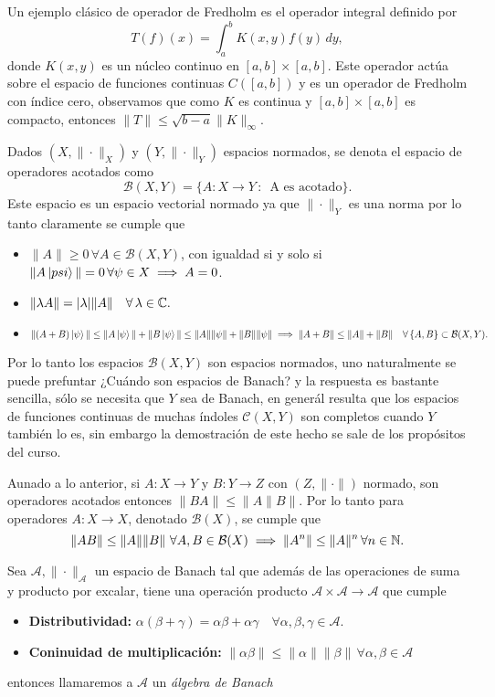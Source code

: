 \documentclass[main.tex]{subfiles}
\begin{document}
\eje Un ejemplo clásico de operador de Fredholm es el operador integral definido por
\[
T(f)(x) = \int_a^b K(x, y) f(y) \, dy,
\]
donde \(K(x, y)\) es un núcleo continuo en \([a, b] \times [a, b]\). Este operador actúa sobre el espacio de funciones continuas \(C([a, b])\) y es un operador de Fredholm con índice cero, observamos que como \(K\) es continua y  \([a, b] \times [a, b]\) es compacto, entonces \(\|T\|\leq\sqrt{b-a}\|K\|_{\infty}\).

\obs Dados \((X,\|\cdot\|_X)\) y \((Y,\|\cdot\|_Y)\) espacios normados, se denota el espacio de operadores acotados como
\[
\mathcal{B}(X,Y)=\{A:X\to Y\,:\,\text{ A es acotado}\}.
\]
\noindent Este espacio es un espacio vectorial normado ya que \(\|\cdot\|_Y\) es una norma por lo tanto claramente se cumple que
\begin{itemize}
    \item \(\|A\| \geq 0\,\forall A \in\mathcal{B}(X,Y) \), con igualdad si y solo si \(\|A\ket{psi}\| = 0\,\forall\psi\in X\implies A = 0\).
    \item \(\|\lambda A\| = |\lambda|\|A\|\quad\forall\,\lambda\in\mathbb C .\)
    \item \(\|(A + B)\ket{\psi}\| \leq \|A\ket{\psi}\| + \|B\ket{\psi}\|\leq \|A\|\|\psi\| + \|B\|\|\psi\| \implies\| A + B\| \leq \|A\| + \|B\|\quad\forall\,\{A,B\}\subset\mathcal{B}(X,Y).\)
\end{itemize}

Por lo tanto los espacios \(\mathcal{B}(X,Y)\) son espacios normados, uno naturalmente se puede prefuntar ¿Cuándo son espacios de Banach? y la respuesta es bastante sencilla, sólo se necesita que \(Y\) sea de Banach, en generál resulta que los espacios de funciones continuas de muchas índoles \(\mathcal{C}(X,Y)\) son completos cuando \(Y\) también lo es, sin embargo la demostración de este hecho se sale de los propósitos del curso.

Aunado a lo anterior, si \(A:X\to Y\) y \(B:Y\to Z\) con \((Z,\|\cdot\|)\) normado, son operadores acotados entonces \(\|BA\|\leq\|A\|B\|\). Por lo tanto para operadores \(A:X\to X\), denotado \(\mathcal{B}(X)\), se cumple que
\[
\|AB\|\leq\|A\|\|B\|\,\,\forall A,B\in\mathcal{B}(X)\implies\|A^n\|\leq\|A\|^n\,\forall n\in \mathbb N .
\]

\begin{def.}
Sea \(\mathcal{A},\|\cdot\|_{\mathcal{A}}\) un espacio de Banach tal que además de las operaciones de suma y producto por excalar, tiene una operación producto \(\mathcal{A}\times\mathcal{A}\to\mathcal{A}\) que cumple
\begin{itemize}
    \item \textbf{Distributividad:} \(\alpha(\beta+\gamma)=\alpha\beta+\alpha\gamma\quad\forall\alpha,\beta,\gamma\in\mathcal{A}\).
    \item \textbf{Coninuidad de multiplicación:} \(\|\alpha\beta\|\leq\|\alpha\|\|\beta\|\,\forall\alpha,\beta\in\mathcal{A}\)
\end{itemize}
entonces llamaremos a \(\mathcal{A}\) un \emph{álgebra de Banach}
\end{def.}
\end{document}
